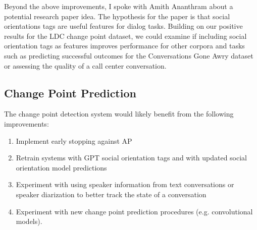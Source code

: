 \documentclass[12pt]{article}
\begin{document}
Beyond the above improvements, I spoke with Amith Ananthram about a potential research paper idea. The hypothesis for the paper is that social orientations tags are useful features for dialog tasks. Building on our positive results for the LDC change point dataset, we could examine if including social orientation tags as features improves performance for other corpora and tasks such as predicting successful outcomes for the Conversations Gone Awry dataset \cite{zhang2018conversations} or assessing the quality of a call center conversation.

\subsection{Change Point Prediction} 
The change point detection system would likely benefit from the following improvements:
\begin{enumerate}
    \item Implement early stopping against AP
    \item Retrain systems with GPT social orientation tags and with updated social orientation model predictions
    \item Experiment with using speaker information from text conversations or speaker diarization to better track the state of a conversation
    \item Experiment with new change point prediction procedures (e.g. convolutional models).
\end{enumerate}
\end{document}
